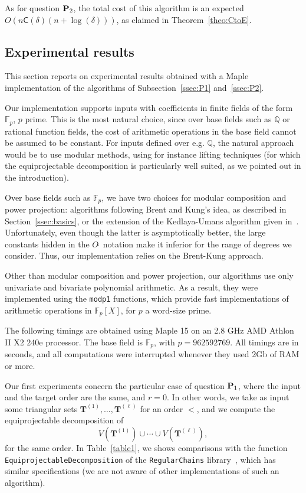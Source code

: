 \documentclass[12pt]{article}
\def\CC {\ensuremath{\mathsf{C}}}
\def\Q {\ensuremath{\mathbb{Q}}}
\def\F {\ensuremath{\mathbb{F}}}
\def\Tt {\ensuremath{\mathbf{T}}}
\def\Ot {O\tilde{~}}
\begin{document}
\medskip

As for question ${\bf P}_2$, the total cost of this algorithm is an
expected $O(n\CC(\delta)(n+\log(\delta)))$, as claimed in
Theorem~\ref{theo:CtoE}.



\subsection{Experimental results}

This section reports on experimental results obtained with a Maple
implementation of the algorithms of Subsection~\ref{ssec:P1}
and~\ref{ssec:P2}.

Our implementation supports inputs with coefficients in finite fields
of the form $\F_p$, $p$ prime. This is the most natural choice, since
over base fields such as $\Q$ or rational function fields, the cost of
arithmetic operations in the base field cannot be assumed to be
constant. For inputs defined over e.g. $\Q$, the natural approach
would be to use modular methods, using for instance lifting techniques
(for which the equiprojectable decomposition is particularly well
suited, as we pointed out in the introduction).

Over base fields such as $\F_p$, we have two choices for modular
composition and power projection: algorithms following Brent and
Kung's idea, as described in Section~\ref{ssec:basics}, or the
extension of the Kedlaya-Umans algorithm given in~\cite{PoSc10}.
Unfortunately, even though the latter is asymptotically better, the
large constants hidden in the $\Ot$ notation make it inferior for the
range of degrees we consider. Thus, our implementation relies on the
Brent-Kung approach.

Other than modular composition and power projection, our algorithms
use only univariate and bivariate polynomial arithmetic. As a result,
they were implemented using the {\tt modp1} functions, which provide
fast implementations of arithmetic operations in $\F_p[X]$, for $p$ a
word-size prime.

The following timings are obtained using Maple 15 on an 2.8 GHz AMD
Athlon II X2 240e processor. The base field is $\F_p$, with
$p=962592769$. All timings are in seconds, and all computations were
interrupted whenever they used 2Gb of RAM or more.

Our first experiments concern the particular case of question ${\bf P}_1$,
where the input and the target order are the same, and $r=0$. In other
words, we take as input some triangular sets
$\Tt^{(1)},\dots,\Tt^{(\ell)}$ for an order $<$, and we compute the
equiprojectable decomposition of
$$V(\Tt^{(1)}) \cup \cdots \cup V(\Tt^{(\ell)}),$$ for the same order.
In Table~\ref{table1}, we shows comparisons with the function {\tt
  Equi\-projectableDe\-com\-position} of the {\tt RegularChains}
library~\cite{LeMoXi05}, which has similar specifications
(we are not aware of other implementations of such an algorithm).
\end{document}
